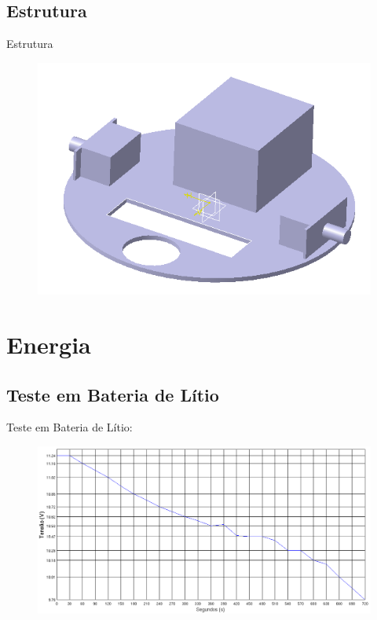 \documentclass{beamer}
\begin{document}
\subsection{Estrutura}
\begin{frame}
    \centering
    Estrutura    
    \begin{figure}
    \centering
    \includegraphics[width=0.8\linewidth]{automotiva_1}
  \end{figure}
\end{frame}
\section{Energia}
\subsection{Teste em Bateria de Lítio}
\begin{frame}
  Teste em Bateria de Lítio:
        \begin{figure}
          \centering
          \includegraphics[width=1\linewidth]{energia_1}
        \end{figure}
\end{frame}
\end{document}
